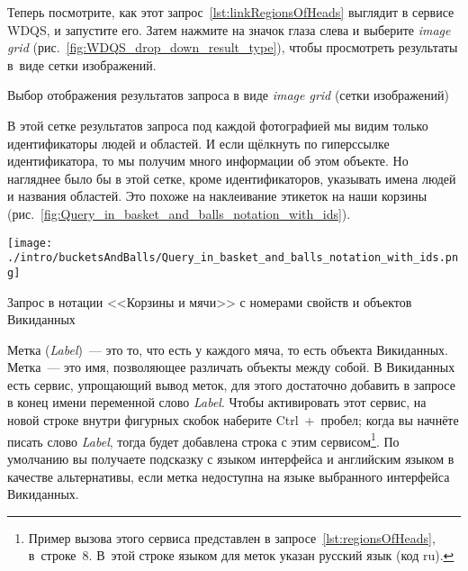\newpage 
Теперь посмотрите, как этот запрос~\ref{lst:linkRegionsOfHeads} выглядит в сервисе WDQS, и запустите его. 
Затем нажмите на значок глаза слева и выберите \textit{image grid} 
(рис.~\ref{fig:WDQS_drop_down_result_type}), чтобы просмотреть результаты в~виде сетки изображений.

\begin{marginfigure}
	{
		\setlength{\fboxsep}{0pt}%
		\setlength{\fboxrule}{1pt}%
	}
    \caption[Выбор отображения результатов запроса в виде сетки изображений.]{Выбор отображения результатов запроса в виде \textit{image grid} (сетки изображений)}
	\label{fig:WDQS_drop_down_result_type}
\end{marginfigure}

В этой сетке результатов запроса 
под каждой фотографией мы видим только идентификаторы людей и областей. 
И если щёлкнуть по гиперссылке идентификатора, то мы получим много информации об этом объекте. 
Но нагляднее было бы в этой сетке, кроме идентификаторов, указывать имена людей и названия областей. 
Это похоже на наклеивание этикеток на наши корзины (рис.~\ref{fig:Query_in_basket_and_balls_notation_with_ids}).

\begin{marginfigure}
\texttt{[image: ./intro/bucketsAndBalls/Query\_in\_basket\_and\_balls\_notation\_with\_ids.png]}
\caption{Запрос в нотации <<Корзины и мячи>> с номерами свойств и объектов Викиданных}
\label{fig:Query_in_basket_and_balls_notation_with_ids}
\end{marginfigure}

Метка (\textit{Label})~--- это то, что есть у каждого мяча, то есть объекта Викиданных. 
Метка~--- это имя, позволяющее различать объекты между собой. 
В Викиданных есть сервис, упрощающий вывод меток, 
для этого достаточно добавить в запросе в конец имени переменной слово \textit{Label}.
Чтобы активировать этот сервис, на новой строке внутри фигурных скобок наберите Ctrl~+~пробел; 
когда вы начнёте писать слово \textit{Label}, тогда будет добавлена строка с этим сервисом\footnote[][12pt]{%
%
Пример вызова этого сервиса представлен в запросе~\ref{lst:regionsOfHeads}, в~строке~8. 
В~этой строке языком для меток указан русский язык (код ru).}. По умолчанию 
вы получаете подсказку с языком интерфейса 
и английским языком в качестве альтернативы, если метка недоступна на языке выбранного интерфейса Викиданных.


